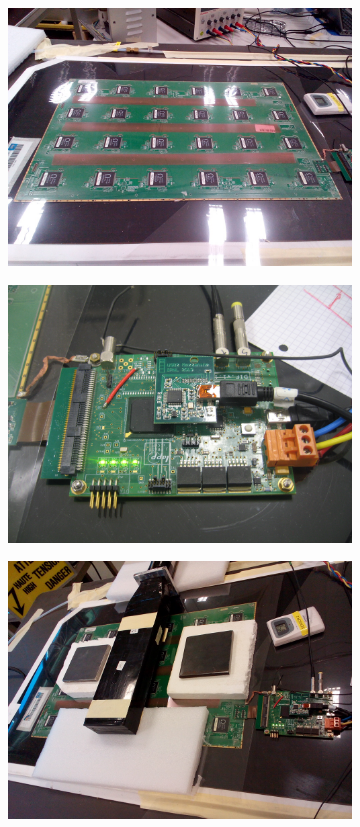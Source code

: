 	\begin{figure}[H]
		\begin{subfigure}{.5\linewidth}
		    \centering
			\includegraphics[width = \linewidth]{fig/chapt6/HARDROC_PCB.jpg}
			\caption{\label{fig:Setup-HARDROC2-904:A}}
		\end{subfigure}
		\begin{subfigure}{.5\linewidth}
		    \centering
			\includegraphics[width = \linewidth]{fig/chapt6/HARDROC_chip.JPG}
			\caption{\label{fig:Setup-HARDROC2-904:B}}
		\end{subfigure}
		\begin{subfigure}{\linewidth}
		    \centering
			\includegraphics[width = 0.5\linewidth]{fig/chapt6/Setup_HARDROC_PAK.jpg}

\end{subfigure}
\end{figure}
